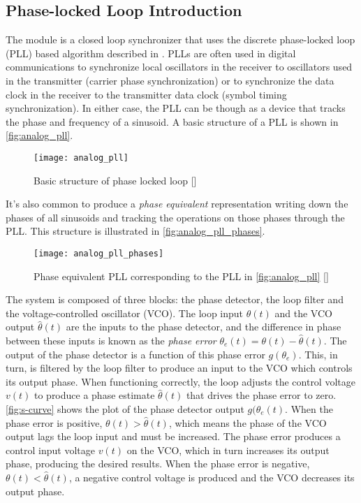 \subsection{Phase-locked Loop Introduction}
\label{sect:pll_intro}
The module is a closed loop synchronizer that uses the discrete phase-locked loop (PLL) based algorithm described in \cite{digcomm_discrete_approach}. PLLs are often used in digital communications to synchronize local oscillators in the receiver to oscillators used in the transmitter (carrier phase synchronization) or to synchronize the data clock in the receiver to the transmitter data clock (symbol timing synchronization). In either case, the PLL can be though as a device that tracks the phase and frequency of a sinusoid. A basic structure of a PLL is shown in \autoref{fig:analog_pll}.

\begin{figure}[ht]
  \centering
  \texttt{[image: analog\_pll]}
  \caption{Basic structure of phase locked loop [\citeauthor{digcomm_discrete_approach}]}
  \label{fig:analog_pll}
\end{figure}

It's also common to produce a \emph{phase equivalent} representation writing down the phases of all sinusoids and tracking the operations on those phases through the PLL. This structure is illustrated in \autoref{fig:analog_pll_phases}.

\begin{figure}[ht]
  \centering
  \texttt{[image: analog\_pll\_phases]}
  \caption{Phase equivalent PLL corresponding to the PLL in \autoref{fig:analog_pll} [\citeauthor{digcomm_discrete_approach}]}
  \label{fig:analog_pll_phases}
\end{figure}

The system is composed of three blocks: the phase detector, the loop filter and the voltage-controlled oscillator (VCO). The loop input $\theta(t)$ and the VCO output $\hat\theta(t)$ are the inputs to the phase detector, and the difference in phase between these inputs is known as the \emph{phase error} $\theta_e(t)=\theta(t) -\hat\theta(t)$. The output of the phase detector is a function of this phase error $g(\theta_e)$. This, in turn, is filtered by the loop filter to produce an input to the VCO which controls its output phase. When functioning correctly, the loop adjusts the control voltage $v(t)$ to produce a phase estimate $\hat\theta(t)$ that drives the phase error to zero. \autoref{fig:s-curve} shows the plot of the phase detector output $g(\theta_e(t)$. When the phase error is positive, $\theta(t) > \hat \theta(t)$, which means the phase of the VCO output lags the loop input and must be increased. The phase error produces a control input voltage $v(t)$ on the VCO, which in turn increases its output phase, producing the desired results. When the phase error is negative, $\theta(t) < \hat \theta(t)$, a negative control voltage is produced and the VCO decreases its output phase.


